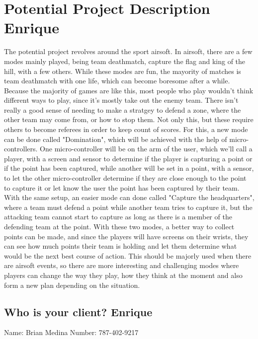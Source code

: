 \chapter{Potential Project Description Enrique}
The potential project revolves around the sport airsoft. In airsoft, there are a few modes mainly played, being team deathmatch, capture the flag and king of the hill, with a few others. While these modes are fun, the mayority of matches is team deathmatch with one life, which can become boresome after a while. Because the majority of games are like this, most people who play wouldn't think different ways to play, since it's mostly take out the enemy team. There isn't really a good sense of needing to make a stratgey to defend a zone, where the other team may come from, or how to stop them. Not only this, but these require others to become referees in order to keep count of scores. For this, a new mode can be done called "Domination", which will be achieved with the help of micro-controllers. One micro-controller will be on the arm of the user, which we'll call a player, with a screen and sensor to determine if the player is capturing a point or if the point has been captured, while another will be set in a point, with a sensor, to let the other micro-controller determine if they are close enough to the point to capture it or let know the user the point has been captured by their team. With the same setup, an easier mode can done called "Capture the headquarters", where a team must defend a point while another team tries to capture it, but the attacking team cannot start to capture as long as there is a member of the defending team at the point. With these two modes, a better way to collect points can be made, and since the players will have screens on their wrists, they can see how much points their team is holding and let them determine what would be the next best course of action. This should be majorly used when there are airsoft events, so there are more interesting and challenging modes where players can change the way they play, how they think at the moment and also form a new plan depending on the situation.
\newpage
\section{Who is your client? Enrique}
Name: Brian Medina
Number: 787-402-9217